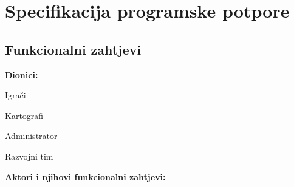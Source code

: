\chapter{Specifikacija programske potpore}
		
	\section{Funkcionalni zahtjevi}			
			
			\noindent \textbf{Dionici:}
			
			\begin{packed_enum}
				
				\item Igrači
				\item Kartografi
				\item Administrator			
				\item Razvojni tim
				
			\end{packed_enum}
			
			\noindent \textbf{Aktori i njihovi funkcionalni zahtjevi:}
			
